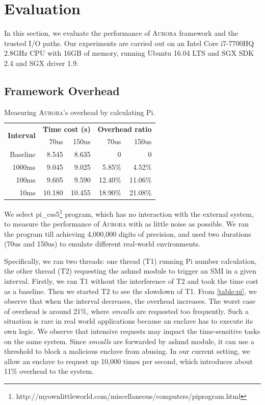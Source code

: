 \section{Evaluation}\label{performance}

In this section, we evaluate the performance of \textsc{Aurora} framework and the trusted I/O paths. Our experiments are carried out on  an Intel Core i7-7700HQ 2.8GHz CPU with 16GB of memory, running Ubuntu 16.04 LTS and SGX SDK 2.4 and SGX driver 1.9.

\subsection{Framework Overhead}

\begin{table}
	\centering
	\caption{Measuring \textsc{Aurora}'s overhead by calculating Pi.}
	\label{table:pi}
	\begin{tabular}{rrrrr}
		\toprule
		\multirow{2}{*}{\textbf{Interval}} & \multicolumn{2}{c}{\textbf{Time cost (s)}} & \multicolumn{2}{c}{\textbf{Overhead ratio}} \\\cmidrule{2-3}	 \cmidrule{4-5}
		& 70us & 150us & 70us & 150us \\
		\midrule
		Baseline & 8.545 & 8.635 & 0 & 0\\
		1000ms & 9.045 & 9.025 & 5.85\% & 4.52\%\\
		100ms & 9.605 & 9.590 & 12.40\% & 11.06\%\\
		10ms & 10.180 & 10.455 & 18.90\% & 21.08\%\\
		\bottomrule
	\end{tabular}
\end{table}

We select  pi\_css5\footnote{http://myownlittleworld.com/miscellaneous/computers/piprogram.html} program, which has no interaction with the external system, to measure the performance of \textsc{Aurora} with as little noise as possible. We ran the program till achieving 4,000,000 digits of precision, and used two durations (70us and 150us) to emulate different real-world environments.

Specifically, we ran two threads: one thread (T1) running Pi number calculation, the other thread (T2) requesting the ashmd module to trigger an SMI in a given interval. Firstly, we ran T1 without the interference of T2 and took the time cost as a baseline. Then we started T2 to see the slowdown of T1. From \autoref{table:pi}, we observe that when the interval decreases, the overhead increases. The worst case of overhead is around 21\%, where \textit{smcalls} are requested too frequently. Such a situation is rare in real world applications because an enclave has to execute its own logic. We observe that intensive requests may impact the time-sensitive tasks on the same system. Since \textit{smcalls} are forwarded by ashmd module, it can use a threshold to block a malicious enclave from abusing. In our current setting, we allow an enclave to request up 10,000 times per second, which introduces about 11\% overhead to the system.

